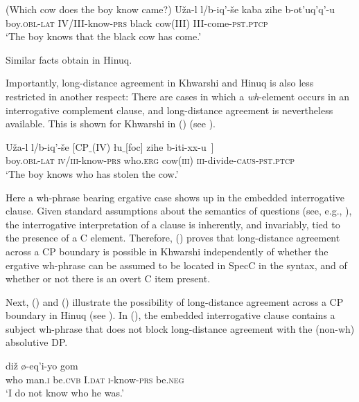 \documentclass[output=paper
,modfonts
,nonflat]{langsci/langscibook}
\begin{document}
\ea\label{ex:mueller:17}
\ea (Which cow does the boy know came?)
\ex
\gll  U\v{z}a-l l/b-iq'-\v{s}e \label{17-b}k\textsuperscript{}aba zihe b-ot'uq'q'-u \\
  boy.{\scshape obl-lat} IV/III-know-{\scshape prs} black cow(III) III-come-{\scshape pst.ptcp} \\
\glt `The boy knows that the black cow has come.'
\z
\z

Similar facts obtain in Hinuq.  

Importantly, long-distance agreement in Khwarshi and Hinuq is also less
restricted in another respect:
There are cases in which a {\em wh}-element occurs in
     an interrogative  complement clause, and long-distance agreement is nevertheless
     available. This is shown for Khwarshi in (\Next) (see \cite{Khalilova09}). 

\ea\label{ex:mueller:18}
\gll U\v{z}a-l l/b-iq'-\v{s}e [CP$\_${\rm (IV)} \l \label{cp1}u$\_${\rm [foc]} zihe b-iti-xx-u~] \\
boy.{\scshape obl-lat} {\scshape iv/iii}-know-{\scshape prs} {} who.{\scshape erg} cow({\scshape iii}) {\scshape iii}-divide-{\scshape caus-pst.ptcp} \\
\glt `The boy knows who has stolen the cow.'
\z

Here a wh-phrase bearing ergative case shows up in the embedded
interrogative clause. Given standard assumptions about the
semantics of questions (see, e.g., \cite{Stechow:96:aga}),
the interrogative interpretation of a clause is inherently, and
invariably, tied to the presence of a C element. Therefore, (\Last)
proves that long-distance agreement across a CP boundary is possible
in Khwarshi independently of whether the ergative wh-phrase can be
assumed to be located in SpecC in the syntax, and of whether or not
there is an overt C item present. 

Next, (\Next) and (\NNext) illustrate the possibility of long-distance
agreement across a CP boundary in Hinuq (see \cite{Forker:11}). In
(\Next), the embedded interrogative clause contains a subject
wh-phrase that does not block long-distance agreement with the
(non-wh) absolutive DP. 

 \ea\label{ex:mueller:19} 
\gll{} di\v{z} \o -eq'i-yo gom \\
  {} who man.{\scshape i} be.{\scshape cvb} I.{\scshape dat} {\scshape i}-know-{\scshape prs}  be.{\scshape neg} \\ 
\glt `I do not know who he was.'
\z
\end{document}

